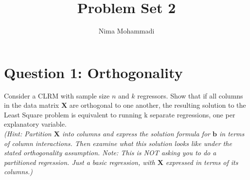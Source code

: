 \documentclass[11pt,reqno]{article}   %
\newcommand{\mlt}[1]{\mathbf{#1}} %
\newcommand{\kX}{\mlt{X}}
\newcommand{\kb}{\mlt{b}}
\begin{document}


\title{Problem Set 2}
\author{Nima Mohammadi} %
\maketitle %



\section*{Question 1: Orthogonality}
Consider a CLRM with sample size $n$ and $k$ regressors.  Show that if all columns in the data matrix $\kX$
 are orthogonal to one another, the resulting solution to the Least Square problem is equivalent
 to running k separate regressions, one per explanatory variable. \\

\textit{(Hint: Partition $\kX$ into columns and express the solution formula for $\kb$ in terms of column interactions.
Then examine what this solution looks like under the stated orthogonality assumption.
Note: This is NOT asking you to do a partitioned regression.
Just a basic regression, with $\kX$ expressed in terms of its columns.) }\\
\end{document}
